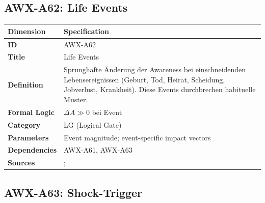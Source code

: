 
\subsection{AWX-A62: Life Events}

\begin{table}[htbp]
\small
\begin{tabular}{p{3cm}p{11cm}}
\toprule
\textbf{Dimension} & \textbf{Specification} \\
\midrule
\textbf{ID} & AWX-A62 \\
\textbf{Title} & Life Events \\
\textbf{Definition} & Sprunghafte Änderung der Awareness bei einschneidenden Lebensereignissen (Geburt, Tod, Heirat, Scheidung, Jobverlust, Krankheit). Diese Events durchbrechen habituelle Muster. \\
\textbf{Formal Logic} & $\Delta A \gg 0$ bei Event \\
\textbf{Category} & LG (Logical Gate) \\
\textbf{Parameters} & Event magnitude; event-specific impact vectors \\
\textbf{Dependencies} & AWX-A61, AWX-A63 \\
\textbf{Sources} & \citet{holmes1967social}; \citet{luhmann2012subjective} \\
\bottomrule
\end{tabular}
\end{table}


\subsection{AWX-A63: Shock-Trigger}

